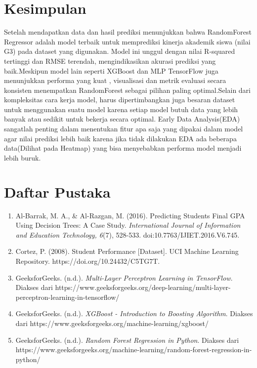 \chapter*{Kesimpulan}

Setelah mendapatkan data dan hasil prediksi menunjukkan bahwa RandomForest Regressor adalah model terbaik untuk memprediksi kinerja akademik 
siswa (nilai G3) pada dataset yang digunakan. Model ini unggul dengan nilai R-squared tertinggi dan RMSE terendah, mengindikasikan akurasi 
prediksi yang baik.Meskipun model lain seperti XGBoost dan MLP TensorFlow juga menunjukkan performa yang kuat
, visualisasi dan metrik evaluasi secara konsisten menempatkan RandomForest sebagai pilihan paling optimal.Selain dari kompleksitas cara kerja  model, harus 
dipertimbangkan juga besaran dataset untuk menggunakan suatu model karena setiap model butuh data yang lebih banyak atau sedikit untuk bekerja secara optimal.
Early Data Analysis(EDA) sangatlah penting dalam menentukan fitur apa saja yang dipakai dalam model agar nilai prediksi lebih baik karena jika tidak 
dilakukan EDA ada beberapa data(Dilihat pada Heatmap) yang bisa menyebabkan performa model menjadi lebih buruk.

\chapter*{Daftar Pustaka}

\begin{enumerate}
    \item Al-Barrak, M. A., \& Al-Razgan, M. {(2016)}. Predicting Students Final GPA Using Decision Trees: A Case Study. \textit{International Journal of Information and Education Technology, 6}{(7)}, 528-533. doi:10.7763{/}IJIET.2016.V6.745.
    \item Cortez, P. (2008). Student Performance [Dataset]. UCI Machine Learning Repository. https://doi.org/10.24432/C5TG7T.
    \item GeeksforGeeks. (n.d.). \textit{Multi-Layer Perceptron Learning in TensorFlow}. Diakses dari https://www.geeksforgeeks.org/deep-learning/multi-layer-perceptron-learning-in-tensorflow/
    
    \item GeeksforGeeks. (n.d.). \textit{XGBoost - Introduction to Boosting Algorithm}. Diakses dari https://www.geeksforgeeks.org/machine-learning/xgboost/
    
    \item GeeksforGeeks. (n.d.). \textit{Random Forest Regression in Python}. Diakses dari https://www.geeksforgeeks.org/machine-learning/random-forest-regression-in-python/
\end{enumerate}